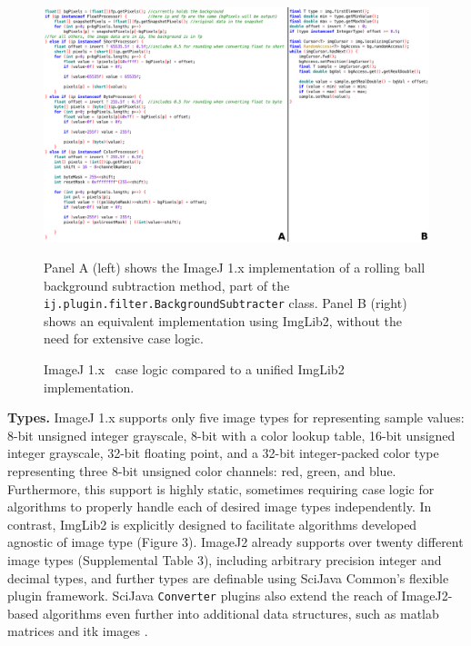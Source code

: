 \documentclass{bmcart}
\begin{document}
  \begin{figure}[h]
    \caption{ImageJ 1.x ~case logic compared to a unified ImgLib2
    implementation.}
    \includegraphics[width=4.75in,natwidth=2384,natheight=1402]{figure-3/figure-labeled.png}
    \begin{flushleft}
      \footnotesize
      Panel A (left) shows the ImageJ 1.x implementation of a rolling ball
      background subtraction method, part of the
      \texttt{ij.plugin.filter.BackgroundSubtracter} class. Panel B (right)
      shows an equivalent implementation using ImgLib2, without the need for
      extensive case logic.
    \end{flushleft}
  \end{figure}

\textbf{Types.} ImageJ 1.x supports only five image types for representing
sample values: 8-bit unsigned integer grayscale, 8-bit with a color lookup
table, 16-bit unsigned integer grayscale, 32-bit floating point, and a 32-bit
integer-packed color type representing three 8-bit unsigned color channels:
red, green, and blue. Furthermore, this support is highly static, sometimes
requiring case logic for algorithms to properly handle each of desired image
types independently. In contrast, ImgLib2 is explicitly designed to facilitate
algorithms developed agnostic of image type (Figure 3). ImageJ2 already
supports over twenty different image types (Supplemental Table 3), including
arbitrary precision integer and decimal types, and further types are definable
using SciJava Common's flexible plugin framework. SciJava \texttt{Converter}
plugins also extend the reach of ImageJ2-based algorithms even further into
additional data structures, such as \acrshort{matlab} matrices
\cite{imagej_matlab} and \acrshort{itk} images \cite{imagej_itk}.
\end{document}
